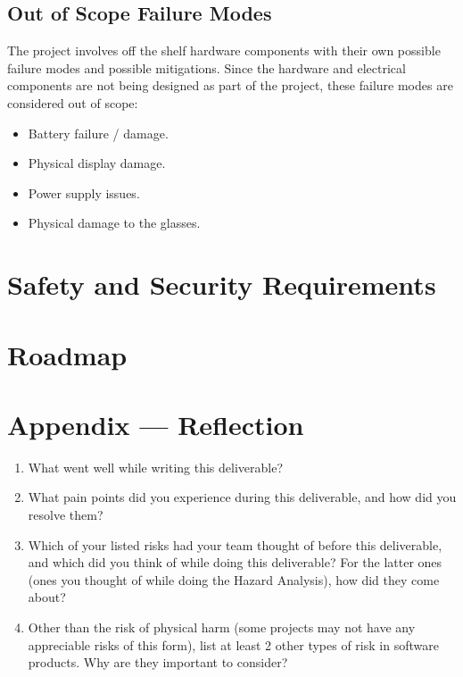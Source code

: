 \documentclass{article}
\begin{document}
\restoregeometry

\pdfpagewidth=8.5in
\pdfpageheight=11in

\subsection{Out of Scope Failure Modes}
The project involves off the shelf hardware components with their own possible
failure modes and possible mitigations. Since the hardware and electrical 
components are not being designed as part of the project, 
these failure modes are considered out of scope:
\begin{itemize}
    \item Battery failure / damage.
    \item Physical display damage.
    \item Power supply issues.
    \item Physical damage to the glasses.
\end{itemize}


\section{Safety and Security Requirements}


\section{Roadmap}


\newpage{}

\section*{Appendix --- Reflection}




\begin{enumerate}
    \item What went well while writing this deliverable? 
    \item What pain points did you experience during this deliverable, and how
    did you resolve them?
    \item Which of your listed risks had your team thought of before this
    deliverable, and which did you think of while doing this deliverable? For
    the latter ones (ones you thought of while doing the Hazard Analysis), how
    did they come about?
    \item Other than the risk of physical harm (some projects may not have any
    appreciable risks of this form), list at least 2 other types of risk in
    software products. Why are they important to consider?
\end{enumerate}
\end{document}
